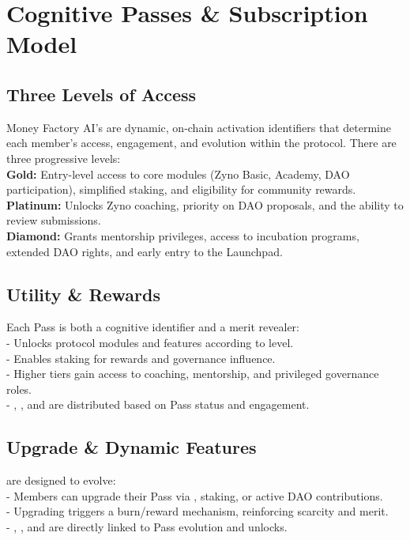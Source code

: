 
\section{Cognitive Passes \& Subscription Model}

\subsection{Three Levels of Access}
Money Factory AI's  are dynamic, on-chain activation identifiers that determine each member's access, engagement, and evolution within the protocol. There are three progressive levels:\\
\textbf{Gold:} Entry-level access to core modules (Zyno Basic, Academy, DAO participation), simplified staking, and eligibility for community rewards.\\
\textbf{Platinum:} Unlocks Zyno coaching, priority on DAO proposals, and the ability to review  submissions.\\
\textbf{Diamond:} Grants mentorship privileges, access to incubation programs, extended DAO rights, and early entry to the Launchpad.

\subsection{Utility \& Rewards}
Each Pass is both a cognitive identifier and a merit revealer:\\
- Unlocks protocol modules and features according to level.\\
- Enables staking for rewards and governance influence.\\
- Higher tiers gain access to coaching, mentorship, and privileged governance roles.\\
- , , and  are distributed based on Pass status and engagement.

\subsection{Upgrade \& Dynamic Features}
 are designed to evolve:\\
- Members can upgrade their Pass via , staking, or active DAO contributions.\\
- Upgrading triggers a burn/reward mechanism, reinforcing scarcity and merit.\\
- , , and  are directly linked to Pass evolution and unlocks.

